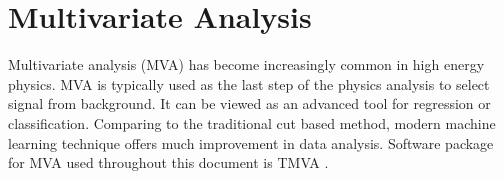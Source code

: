 \section{Multivariate Analysis}
\label{sec:pandoraMVA}

Multivariate analysis (MVA) has become increasingly common in high energy physics. MVA is typically used as the last step of the physics analysis to select signal from background. It can be viewed as an advanced tool for regression or classification. Comparing to the traditional cut based method, modern machine learning technique offers much improvement in data analysis. Software package for MVA used throughout this document is TMVA \cite{Hocker:2007ht}.


